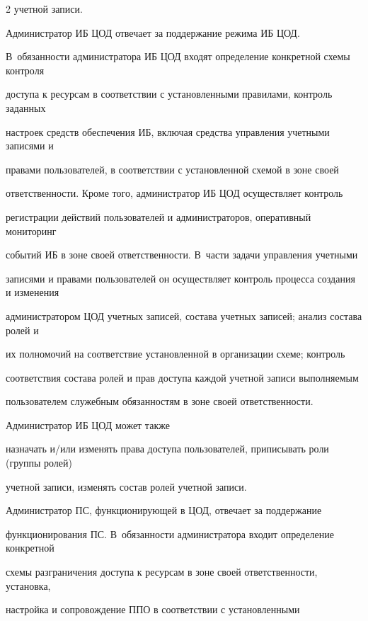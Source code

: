 \begin{multicols}{2}
учетной записи.


       


       Администратор ИБ ЦОД отвечает за поддержание режима ИБ ЦОД. 


В~обязанности администратора ИБ ЦОД входят определение конкретной схемы контроля 


доступа к ресурсам в соответствии с уста\-нов\-лен\-ны\-ми правилами, контроль заданных 


настроек средств обеспечения ИБ, включая средства управления учетными записями и 


правами пользователей, в соответствии с уста\-нов\-лен\-ной схемой в зоне своей 


ответственности. Кроме того, администратор ИБ ЦОД осуществляет контроль 


регистрации действий пользователей и администраторов, оперативный мониторинг 


событий ИБ в зоне своей ответственности. В~час\-ти задачи управ\-ле\-ния учетными 


записями и правами пользователей он осуществляет контроль процесса создания и изменения 


администратором ЦОД учетных записей, состава учетных записей; анализ состава ролей и 


их полномочий на соответствие уста\-нов\-лен\-ной в организации схеме; контроль 


соответствия состава ролей и прав доступа каждой учетной записи выполняемым 


пользователем служебным обязанностям в зоне своей ответственности. 


Администратор ИБ ЦОД может также 


назначать и/или изменять права доступа пользователей, приписывать роли (группы ролей) 


учетной записи, изменять состав ролей учетной записи.


       


       Администратор ПС, функционирующей в ЦОД, отвечает за поддержание 


функционирования ПС. В~обязанности администратора входит определение конкретной 


схемы разграничения доступа к ресурсам в зоне своей ответственности, уста\-нов\-ка, 


настройка и сопровождение ППО в соответствии с уста\-нов\-лен\-ны\-ми 



\end{multicols}
